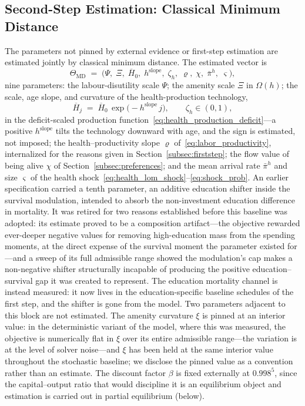 \documentclass[12pt,a4paper]{article}
\begin{document}
\subsection{Second-Step Estimation: Classical Minimum Distance}
\label{subsec:secondstep_smm}

The parameters not pinned by external evidence or first-step estimation are estimated jointly by classical minimum distance. The estimated vector is
\[
\Theta_{\mathrm{MD}} \;=\; \bigl(\Psi,\; \Xi,\; \overline{H}_0,\; h^{\mathrm{slope}},\; \zeta_h,\; \varrho,\; \chi,\; \bar\pi^h,\; \varsigma\bigr),
\]
nine parameters: the labour-disutility scale $\Psi$; the amenity scale $\Xi$ in $\Omega(h)$; the scale, age slope, and curvature of the health-production technology,
\begin{equation}
\label{eq:healthproduction}
\overline{H}_{j} \;=\; \overline{H}_{0}\,\exp\bigl(-h^{\mathrm{slope}}\, j\bigr), \qquad \zeta_h \in (0,1),
\end{equation}
in the deficit-scaled production function~\eqref{eq:health_production_deficit}---a positive $h^{\mathrm{slope}}$ tilts the technology downward with age, and the sign is estimated, not imposed; the health--productivity slope $\varrho$ of~\eqref{eq:labor_productivity}, internalized for the reasons given in Section~\ref{subsec:firststep}; the flow value of being alive $\chi$ of Section~\ref{subsec:preferences}; and the mean arrival rate $\bar\pi^h$ and size $\varsigma$ of the health shock~\eqref{eq:health_lom_shock}--\eqref{eq:shock_prob}. An earlier specification carried a tenth parameter, an additive education shifter inside the survival modulation, intended to absorb the non-investment education difference in mortality. It was retired for two reasons established before this baseline was adopted: its estimate proved to be a composition artifact---the objective rewarded ever-deeper negative values for removing high-education mass from the spending moments, at the direct expense of the survival moment the parameter existed for---and a sweep of its full admissible range showed the modulation's cap makes a non-negative shifter structurally incapable of producing the positive education--survival gap it was created to represent. The education mortality channel is instead measured: it now lives in the education-specific baseline schedules of the first step, and the shifter is gone from the model. Two parameters adjacent to this block are not estimated. The amenity curvature $\xi$ is pinned at an interior value: in the deterministic variant of the model, where this was measured, the objective is numerically flat in $\xi$ over its entire admissible range---the variation is at the level of solver noise---and $\xi$ has been held at the same interior value throughout the stochastic baseline; we disclose the pinned value as a convention rather than an estimate. The discount factor $\beta$ is fixed externally at $0.998^5$, since the capital--output ratio that would discipline it is an equilibrium object and estimation is carried out in partial equilibrium (below).
\end{document}
